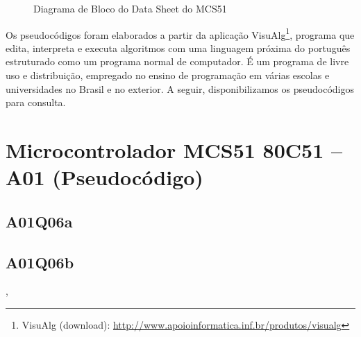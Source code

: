 \documentclass[
	12pt,				%
	openright,			%
  oneside,     %
	a4paper,			%
	english,			%
	french,				%
	spanish,			%
	brazil				%
	]{abntex2}
\begin{document}
\newpage

  \begin{figure}[H]
    \centering
    
    \caption{\label{fig:datasheet-cap1-2}Diagrama de Bloco do Data Sheet do MCS51}
  \end{figure}

\newpage

Os pseudocódigos foram elaborados a partir da aplicação VisuAlg\footnote{VisuAlg (download): \url{http://www.apoioinformatica.inf.br/produtos/visualg}}, programa que edita, interpreta e executa algoritmos com uma linguagem próxima do português estruturado como um programa normal de computador. É um programa de livre uso e distribuição, empregado no ensino de programação em várias escolas e universidades no Brasil e no exterior. A seguir, disponibilizamos os pseudocódigos para consulta.

\section*{Microcontrolador MCS51 80C51 -- A01 (Pseudocódigo)}
\subsection*{A01Q06a}

\subsection*{A01Q06b}

,


%
%
\end{document}

